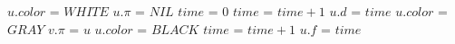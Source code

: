 \documentclass[a4paper]{article}
\begin{document}
\begin{itemize}
\begin{algorithm}[H]
\begin{algorithmic}[1]
                \State $u.color$ = $WHITE$
                \State $u.\pi$ = $NIL$
            \EndFor
            \State $time$ = 0
                    \State {}
                \EndIf
            \EndFor
            \Statex
            \Statex {}
            \State $time$ = $time+1$
            \State $u.d$ = $time$
            \State $u.color$ = $GRAY$
                    \State $v.\pi$ = $u$
                    \State {}
                \EndIf
            \EndFor
            \State $u.color$ = $BLACK$
            \State $time$ = $time+1$
            \State $u.f$ = $time$
        \end{algorithmic}
    \end{algorithm}
\end{itemize}
\end{document}
